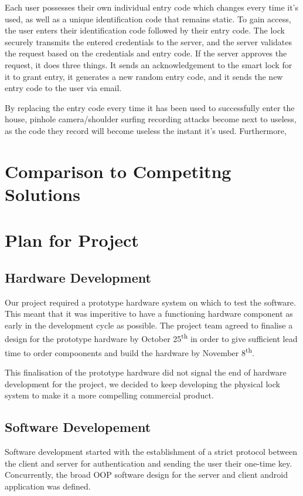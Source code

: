 \documentclass[conference]{IEEEtran}
\begin{document}
Each user possesses their own individual entry code which changes every time it’s used, as well as a unique identification code that remains static. To gain access, the user enters their identification code followed by their entry code. The lock securely transmits the entered credentials to the server, and the server validates the request based on the credentials and entry code. If the server approves the request, it does three things. It sends an acknowledgement to the smart lock for it to grant entry, it generates a new random entry code, and it sends the new entry code to the user via email. 

By replacing the entry code every time it has been used to successfully enter the house, pinhole camera/shoulder surfing recording attacks become next to useless, as the code they record will become useless the instant it’s used. Furthermore,
\section{Comparison to Competitng Solutions}

\section{Plan for Project}
\subsection{Hardware Development}
	Our project required a prototype hardware system on which to test the software. This meant that it was imperitive to have a functioning hardware component as early in the development cycle as possible. The project team agreed to finalise a design for the prototype hardware by October 25\textsuperscript{th} in order to give sufficient lead time to order compoonents and build the hardware by November 8\textsuperscript{th}.


	This finalisation of the prototype hardware did not signal the end of hardware development for the project, we decided to keep developing the physical lock system to make it a more compelling commercial product.

\subsection{Software Developement}
	Software development started with the establishment of a strict protocol between the client and server for authentication and sending the user their one-time key. Concurrently, the broad OOP software design for the server and client android application was defined.
\end{document}
